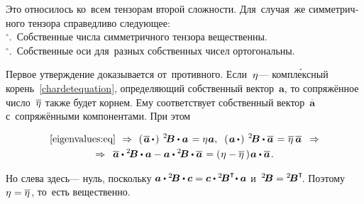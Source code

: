 \begin{otherlanguage}{russian}
Это относилось ко~всем тензорам второй сложности. Для~случая~же симметричного тензора справедливо следующее:\\
$^{\circ}$\hspace{-1ex}.\, Собственные числа симметричного тензора вещественны.\\
$^{\circ}$\hspace{-1ex}.\, Собственные оси для~разных собственных чисел ортогональны.

Первое утверждение доказывается от~противного. Если~$\eta\hspace{.1ex}$\:--- компл\'{е}ксный корень~\eqref{chardetequation}, определяющий собственный вектор~$\bm{a}$, то сопряжённое число~$\overline{\eta\hspace{.1ex}}$ также будет корнем. Ему соответствует собственный вектор~$\overline{\bm{a}}$ с~сопряжёнными компонентами. При этом

\nopagebreak\vspace{-0.4em}\begin{multline*}
\eqref{eigenvalues:eq}
\:\,\Rightarrow\:\,
\left(\hspace{.25ex} {\overline{\bm{a}} \, \dotp} \hspace{.25ex}\right) \hspace{.5ex} {^2\!\bm{B}} \dotp \bm{a} \hspace{.2ex} = \eigenvalue \bm{a}, \;\;
\left(\hspace{.2ex}{\bm{a} \, \dotp}\hspace{.2ex}\right) \hspace{.5ex} {^2\!\bm{B}} \dotp \overline{\bm{a}} \hspace{.2ex} = \hspace{.1ex} \overline{\eigenvalue} \, \overline{\bm{a}}
\:\;\Rightarrow \\[-0.1em]
%
\Rightarrow\;\: \overline{\bm{a}} \dotp {^2\!\bm{B}} \dotp \bm{a} - \bm{a} \dotp {^2\!\bm{B}} \dotp \overline{\bm{a}} \hspace{.2ex} = \left(\hspace{.1ex}{\eigenvalue - \overline{\eigenvalue}}\hspace{.16em}\right)\hspace{-0.1em} \bm{a} \dotp \overline{\bm{a}} \hspace{.2ex} .
\end{multline*}

\vspace{-0.16em} \noindent Но слева здесь\:--- нуль, поскольку ${\bm{a} \dotp {^2\!\bm{B}} \dotp \bm{c} = \bm{c} \dotp {^2\!\bm{B}^{\T}\!} \dotp \bm{a}}$ и~${{^2\!\bm{B}} = {^2\!\bm{B}^{\T}\!}}$. Поэтому ${\eta\hspace{.1ex} = \overline{\eta\hspace{.1ex}}}$, то~есть вещественно.


\end{otherlanguage}
